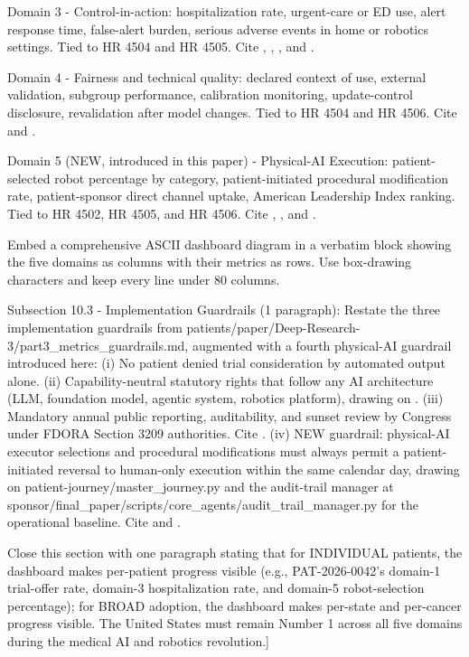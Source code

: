Domain 3 - Control-in-action: hospitalization rate, urgent-care or ED
use, alert response time, false-alert burden, serious adverse events
in home or robotics settings. Tied to HR 4504 and HR 4505. Cite
\cite{rocque2025remote_symptom_monitoring},
\cite{gonzalez2025bayesian_urgent_care_nsclc},
\cite{dronca2026cancer_care_beyond_walls}, and
\cite{target2025robotic_bronchoscopy}.

Domain 4 - Fairness and technical quality: declared context of use,
external validation, subgroup performance, calibration monitoring,
update-control disclosure, revalidation after model changes. Tied to
HR 4504 and HR 4506. Cite \cite{fda_ai_regulatory_decision_draft_2025}
and \cite{vorontsov2024virchow}.

Domain 5 (NEW, introduced in this paper) - Physical-AI Execution:
patient-selected robot percentage by category, patient-initiated
procedural modification rate, patient-sponsor direct channel uptake,
American Leadership Index ranking. Tied to HR 4502, HR 4505, and HR
4506. Cite \cite{kawchak_2026_18810541}, \cite{kawchak_2026_18778219},
and \cite{kawchak_2026_19244918}.

Embed a comprehensive ASCII dashboard diagram in a verbatim block
showing the five domains as columns with their metrics as rows. Use
box-drawing characters and keep every line under 80 columns.

Subsection 10.3 - Implementation Guardrails (1 paragraph): Restate
the three implementation guardrails from
patients/paper/Deep-Research-3/part3\_metrics\_guardrails.md,
augmented with a fourth physical-AI guardrail introduced here:
(i) No patient denied trial consideration by automated output alone.
(ii) Capability-neutral statutory rights that follow any AI
     architecture (LLM, foundation model, agentic system, robotics
     platform), drawing on
     \cite{fda_ai_regulatory_decision_draft_2025}.
(iii) Mandatory annual public reporting, auditability, and sunset
      review by Congress under FDORA Section 3209 authorities. Cite
      \cite{rank4_fdora_fda_modernization_2022}.
(iv) NEW guardrail: physical-AI executor selections and procedural
     modifications must always permit a patient-initiated reversal
     to human-only execution within the same calendar day, drawing
     on patient-journey/master\_journey.py and the audit-trail
     manager at sponsor/final\_paper/scripts/core\_agents/audit\_trail\_manager.py
     for the operational baseline. Cite \cite{kawchak_2026_19119939}
     and \cite{kawchak_2026_19396256}.

Close this section with one paragraph stating that for INDIVIDUAL
patients, the dashboard makes per-patient progress visible (e.g.,
PAT-2026-0042's domain-1 trial-offer rate, domain-3 hospitalization
rate, and domain-5 robot-selection percentage); for BROAD adoption,
the dashboard makes per-state and per-cancer progress visible. The
United States must remain Number 1 across all five domains during
the medical AI and robotics revolution.]
